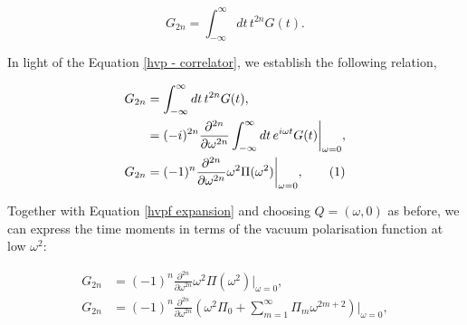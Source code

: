 \documentclass{article}
\numberwithin{equation}{section} %
\begin{document}
\begin{equation}
G_{2n} = \int^\infty_{-\infty} dt \, t^{2n} G(t).
\end{equation}

In light of the Equation \ref{hvp - correlator}, we establish the following relation,

\begin{align*}
G_{2n} &= \int^\infty_{-\infty} dt \, t^{2n} G(t),\\
&=  (-i)^{2n} \frac{\partial^{2n}}{\partial \omega^{2n}}\int^\infty_{-\infty} dt \,  e^{i\omega t} G(t) \bigg \vert_{\omega=0} ,\\
G_{2n}&=  (-1)^{n} \frac{\partial^{2n}}{\partial \omega^{2n}} \omega^2 \Pi(\omega^2)\bigg \vert_{\omega=0} ,
\tag{\refstepcounter{equation}\theequation}
\end{align*}

Together with Equation \ref{hvpf expansion} and choosing $Q=(\omega,0)$ as before, we can express the time moments in terms of the vacuum polarisation function at low $\omega^2$:

\begin{equation}
\begin{split}
G_{2n}&=  (-1)^{n} \frac{\partial^{2n}}{\partial \omega^{2n}} \omega^2 \Pi(\omega^2)\bigg \vert_{\omega=0} ,\\
G_{2n}&=  (-1)^{n} \frac{\partial^{2n}}{\partial \omega^{2n}} (\omega^2 \Pi_0 + \sum_{m=1}^\infty \Pi_m \omega^{2m+2})\bigg \vert_{\omega=0} ,\\
\end{split}
\end{equation}


\end{document}
